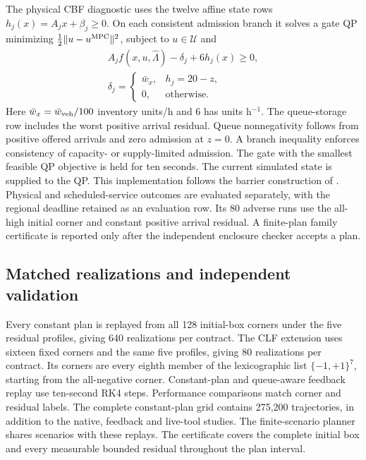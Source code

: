 \documentclass[preprint,12pt]{elsarticle}
\begin{document}
The physical CBF diagnostic uses the twelve affine state rows
$h_j(x)=A_jx+\beta_j\ge0$. On each consistent admission branch it solves a
gate QP minimizing $\frac12\|u-u^{\rm MPC}\|^2$, subject to
$u\in\mathcal U$ and
\begin{equation}
\begin{gathered}
A_jf(x,u,\widehat\Lambda)-\delta_j+6h_j(x)\ge0,\\
\delta_j=\begin{cases}\bar w_x,&h_j=20-z,\\0,&\text{otherwise}.
\end{cases}
\end{gathered}
\label{eq:benchmark-cbf}
\end{equation}
Here $\bar w_x=\bar w_{\rm veh}/100$ inventory units/h and $6$ has units
h$^{-1}$. The queue-storage row includes the worst positive arrival
residual. Queue nonnegativity follows from positive offered arrivals and
zero admission at $z=0$. A branch inequality enforces consistency of
capacity- or supply-limited admission. The gate with the smallest feasible
QP objective is held for ten seconds. The current simulated state is
supplied to the QP. This implementation follows the barrier construction
of \cite{ames2017}. Physical and scheduled-service outcomes are evaluated
separately, with the regional deadline retained as an evaluation row.
Its 80 adverse runs use the all-high initial corner and constant positive
arrival residual. A finite-plan family certificate is reported only after
the independent enclosure checker accepts a plan.

\subsection{Matched realizations and independent validation}
Every constant plan is replayed from all 128 initial-box corners under the
five residual profiles, giving 640 realizations per contract. The CLF
extension uses sixteen fixed corners and the same five profiles, giving
80 realizations per contract. Its corners are every eighth member of the
lexicographic list $\{-1,+1\}^7$, starting from the all-negative corner.
Constant-plan and queue-aware feedback replay use ten-second RK4 steps.
Performance comparisons match corner and residual labels. The complete
constant-plan grid contains 275,200 trajectories, in addition to the
native, feedback and live-tool studies. The finite-scenario planner shares
scenarios with these replays. The certificate covers the complete initial
box and every measurable bounded residual throughout the plan interval.
\end{document}
